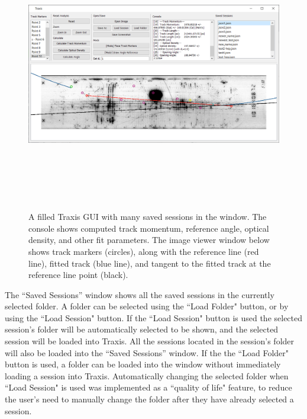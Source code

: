 \documentclass[12pt]{article} %
\begin{document}
\begin{figure}[htb]
    \centering
    \includegraphics[width = \linewidth, height = 12cm]{traxis_filled_photo.PNG}
    \caption{A filled Traxis GUI with many saved sessions in the window. The console shows computed track momentum, reference angle, optical density, and other fit parameters. The image viewer window below shows track markers (circles), along with the reference line (red line), fitted track (blue line), and tangent to the fitted track at the reference line point (black).}
    \label{fig:traxis_gui_filled}
\end{figure}

The ``Saved Sessions'' window shows all the saved sessions in the currently selected folder. A folder can be selected using the ``Load Folder" button, or by using the ``Load Session" button. If the ``Load Session" button is used the selected session's folder will be automatically selected to be shown, and the selected session will be loaded into Traxis. All the sessions located in the session's folder will also be loaded into the ``Saved Sessions'' window. If the the ``Load Folder" button is used, a folder can be loaded into the window without immediately loading a session into Traxis. Automatically changing the selected folder when ``Load Session" is used was implemented as a ``quality of life" feature, to reduce the user's need to manually change the folder after they have already selected a session.
\end{document}
